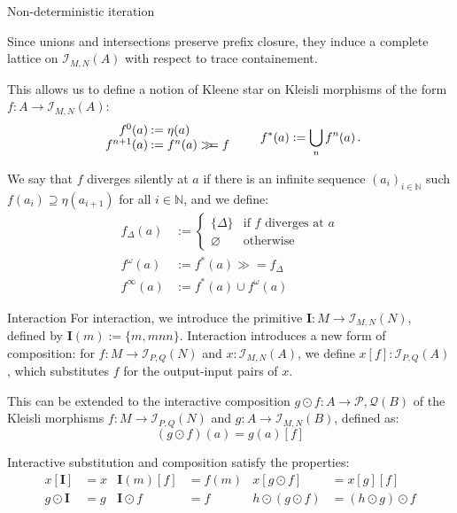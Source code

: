 \documentclass{beamer}
\newcommand{\bind}{\gg\!\!=}
\begin{document}
\begin{frame}{Non-deterministic iteration} %

Since unions and intersections preserve prefix closure,
they induce a complete lattice on $\mathcal{I}_{M,N}(A)$
with respect to trace containement.

This allows us to define a notion of Kleene star
on Kleisli morphisms of the form $f : A \rightarrow \mathcal{I}_{M,N}(A)$:
\[
  \begin{array}{r@{\:}l}
    f^0(a) &:= \eta(a) \\
    f^{n+1}(a) &:= f^n(a) \bind f
  \end{array}
  \qquad
  f^*(a) := \bigcup_n f^n(a) \,.
\]

We say that $f$ diverges silently at $a$
if there is an infinite sequence $(a_i)_{i \in \mathbb{N}}$
such $f(a_i) \supseteq \eta(a_{i+1})$ for all $i \in \mathbb{N}$,
and we define:
\begin{align*}
f_\Delta(a) &:= \begin{cases}
  \{\Delta\} & \mbox{if } f \mbox{ diverges at } a \\
  \varnothing & \mbox{otherwise}
\end{cases} \\
f^\omega(a) &:= f^*(a) \bind f_\Delta \\
f^\infty(a) &:= f^*(a) \cup f^\omega(a)
\end{align*}

\end{frame}

\begin{frame}{Interaction} %
For interaction,
we introduce the primitive $\mathbf{I} : M \rightarrow \mathcal{I}_{M,N}(N)$,
defined by $\mathbf{I}(m) := \{ m, mnn \}$.
Interaction introduces a new form of composition:
for $f : M \rightarrow \mathcal{I}_{P,Q}(N)$ and $x : \mathcal{I}_{M,N}(A)$,
we define
$x[f] : \mathcal{I}_{P,Q}(A)$,
which substitutes $f$ for the output-input pairs of $x$.
\vfill

This can be extended to the interactive composition
$g \odot f : A \rightarrow \mathcal{P,Q}(B)$ of the Kleisli morphisms
$f : M \rightarrow \mathcal{I}_{P,Q}(N)$ and
$g : A \rightarrow \mathcal{I}_{M,N}(B)$,
defined as:
\[ (g \odot f)(a) = g(a)[f] \]

Interactive substitution and composition satisfy the properties:
\begin{align*}
  x[\mathbf{I}] &= x &
  \mathbf{I}(m)[f] &= f(m) &
  x[g \odot f] &= x[g][f] \\
  g \odot \mathbf{I} &= g &
  \mathbf{I} \odot f &= f &
  h \odot (g \odot f) &= (h \odot g) \odot f
\end{align*}

\end{frame}
\end{document}
